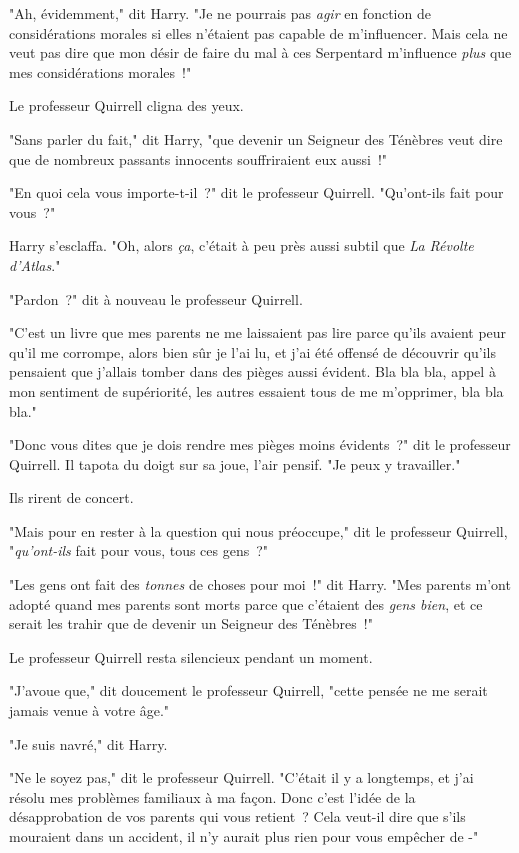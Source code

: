 "Ah, évidemment," dit Harry. "Je ne pourrais pas \emph{agir} en fonction de considérations morales si elles n'étaient pas capable de m'influencer. Mais cela ne veut pas dire que mon désir de faire du mal à ces Serpentard m'influence \emph{plus} que mes considérations morales~!"

Le professeur Quirrell cligna des yeux.

"Sans parler du fait," dit Harry, "que devenir un Seigneur des Ténèbres veut dire que de nombreux passants innocents souffriraient eux aussi~!"

"En quoi cela vous importe-t-il~?" dit le professeur Quirrell. "Qu'ont-ils fait pour vous~?"

Harry s'esclaffa. "Oh, alors \emph{ça}, c'était à peu près aussi subtil que \emph{La Révolte d'Atlas}."

"Pardon~?" dit à nouveau le professeur Quirrell.

"C'est un livre que mes parents ne me laissaient pas lire parce qu'ils avaient peur qu'il me corrompe, alors bien sûr je l'ai lu, et j'ai été offensé de découvrir qu'ils pensaient que j'allais tomber dans des pièges aussi évident. Bla bla bla, appel à mon sentiment de supériorité, les autres essaient tous de me m'opprimer, bla bla bla."

"Donc vous dites que je dois rendre mes pièges moins évidents~?" dit le professeur Quirrell. Il tapota du doigt sur sa joue, l'air pensif. "Je peux y travailler."

Ils rirent de concert.

"Mais pour en rester à la question qui nous préoccupe," dit le professeur Quirrell, "\emph{qu'ont-ils} fait pour vous, tous ces gens~?"

"Les gens ont fait des \emph{tonnes} de choses pour moi~!" dit Harry. "Mes parents m'ont adopté quand mes parents sont morts parce que c'étaient des \emph{gens bien}, et ce serait les trahir que de devenir un Seigneur des Ténèbres~!"

Le professeur Quirrell resta silencieux pendant un moment.

"J'avoue que," dit doucement le professeur Quirrell, "cette pensée ne me serait jamais venue à votre âge."

"Je suis navré," dit Harry.

"Ne le soyez pas," dit le professeur Quirrell. "C'était il y a longtemps, et j'ai résolu mes problèmes familiaux à ma façon. Donc c'est l'idée de la désapprobation de vos parents qui vous retient~? Cela veut-il dire que s'ils mouraient dans un accident, il n'y aurait plus rien pour vous empêcher de -"

